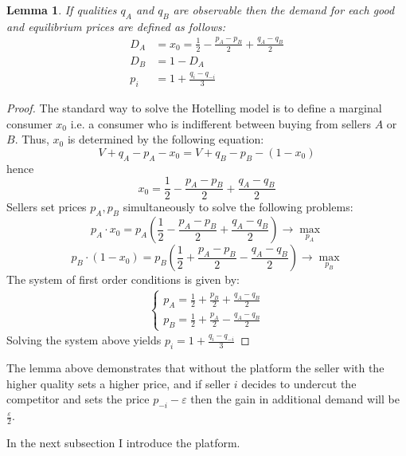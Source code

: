 \documentclass[a4paper]{article}
\newtheorem{lemma}[theorem]{Lemma}
\begin{document}
	\begin{lemma}\label{without}
		If qualities $q_A$ and $q_B$ are observable then the demand for each good and equilibrium prices are defined as follows:
		\begin{align*}
		D_A &= x_0 = \frac{1}{2} - \frac{p_A - p_{B}}{2} + \frac{q_A-q_{B}}{2}\\
		D_B &= 1 - D_A\\
		p_i &= 1 + \frac{q_i - q_{-i}}{3}
		\end{align*}
	\end{lemma}
\begin{proof}
	The standard way to solve the Hotelling model is to define a marginal consumer $x_0$ i.e. a consumer who is indifferent between buying from sellers $A$ or $B$. Thus, $x_0$ is determined by the following equation: $$V+q_A-p_A - x_0 = V+q_B - p_B - (1-x_0)$$
	hence $$x_0 = \frac{1}{2} - \frac{p_A - p_B}{2} + \frac{q_A - q_B}{2}$$
	Sellers set prices $p_A, p_B$ simultaneously to solve the following problems:
	$$p_A \cdot x_0 = p_A \left(\frac{1}{2} - \frac{p_A - p_B}{2} + \frac{q_A - q_B}{2}\right) \to \underset{p_A}{\max}$$
	$$p_B \cdot (1-x_0) = p_B \left(\frac{1}{2} + \frac{p_A - p_B}{2} - \frac{q_A - q_B}{2}\right) \to \underset{p_B}{\max}$$
	The system of first order conditions is given by:
	\begin{align*}
	\begin{cases}
	p_A = \frac{1}{2} + \frac{p_B}{2} + \frac{q_A - q_B}{2}\\
	p_B = \frac{1}{2} + \frac{p_A}{2} - \frac{q_A - q_B}{2}
	\end{cases}
	\end{align*}
	Solving the system above yields $p_i = 1 + \frac{q_i - q_{-i}}{3}$
\end{proof}
	The lemma above demonstrates that without the platform the seller with the higher quality sets a higher price, and if seller $i$ decides to undercut the competitor and sets the price $p_{-i} - \varepsilon$ then the gain in additional demand will be $\frac{\varepsilon}{2}$.
	
	
	
	In the next subsection I introduce the platform.
	
	
\end{document}
